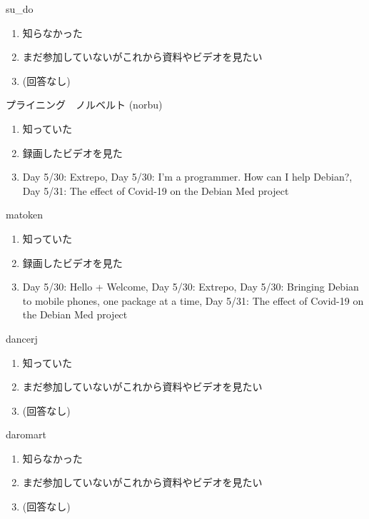 \begin{prework}{ su\_do }
  \begin{enumerate}
  \item 知らなかった
  \item まだ参加していないがこれから資料やビデオを見たい
  \item (回答なし)
  \end{enumerate}
\end{prework}

\begin{prework}{ プライニング　ノルベルト (norbu)}
  \begin{enumerate}
  \item 知っていた
  \item 録画したビデオを見た
  \item Day 5/30: Extrepo, Day 5/30: I'm a programmer. How can I help Debian?, Day 5/31: The effect of Covid-19 on the Debian Med project
  \end{enumerate}
\end{prework}

\begin{prework}{ matoken }
  \begin{enumerate}
  \item 知っていた
  \item 録画したビデオを見た
  \item Day 5/30: Hello + Welcome, Day 5/30: Extrepo, Day 5/30: Bringing Debian to mobile phones, one package at a time, Day 5/31: The effect of Covid-19 on the Debian Med project
  \end{enumerate}
\end{prework}

\begin{prework}{ dancerj }
  \begin{enumerate}
  \item 知っていた
  \item まだ参加していないがこれから資料やビデオを見たい
  \item (回答なし)
  \end{enumerate}
\end{prework}

\begin{prework}{ daromart }
  \begin{enumerate}
  \item 知らなかった
  \item まだ参加していないがこれから資料やビデオを見たい
  \item (回答なし)
  \end{enumerate}
\end{prework}

